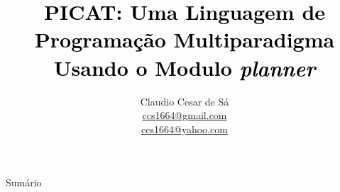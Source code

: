 \documentclass[xcolor=table]{beamer}
\title[Picat]{\fontsize{20}{30}\selectfont \textcolor{black}{PICAT: Uma Linguagem de Programação Multiparadigma\\
Usando o Modulo \textit{planner}}}
\author[Claudio Cesar de Sá]{Claudio Cesar de Sá
\\\medskip 
\Letter \/ {\small \url{ccs1664@gmail.com}}\\
\Letter \/ {\small \url{ccs1664@yahoo.com}}
}
\institute[]{
    Pesquisador Independente \\
    \url{https://claudiocesar.wordpress.com/}

}
\begin{document}
\begin{frame}
    \titlepage
\end{frame}

% 
%
  \begin{frame}[allowframebreaks,c]{Sumário}
   \tableofcontents
  \end{frame}

\end{document}
